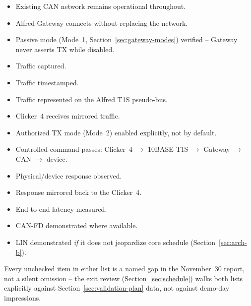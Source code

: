\begin{itemize}[itemsep=0.1em, label={$\square$}]
\item Existing CAN network remains operational throughout.
\item Alfred Gateway connects without replacing the network.
\item Passive mode (Mode~1, Section~\ref{sec:gateway-modes}) verified -- Gateway never asserts TX while disabled.
\item Traffic captured.
\item Traffic timestamped.
\item Traffic represented on the Alfred T1S pseudo-bus.
\item Clicker~4 receives mirrored traffic.
\item Authorized TX mode (Mode~2) enabled explicitly, not by default.
\item Controlled command passes: Clicker~4 $\rightarrow$ 10BASE-T1S $\rightarrow$ Gateway $\rightarrow$ CAN $\rightarrow$ device.
\item Physical/device response observed.
\item Response mirrored back to the Clicker~4.
\item End-to-end latency measured.
\item CAN-FD demonstrated where available.
\item LIN demonstrated \emph{if} it does not jeopardize core schedule (Section~\ref{sec:arch-b}).
\end{itemize}

\begin{decision}[title={How this gate is scored}]
Every unchecked item in either list is a named gap in the November~30 report, not a silent omission -- the exit review (Section~\ref{sec:schedule}) walks both lists explicitly against Section~\ref{sec:validation-plan} data, not against demo-day impressions.
\end{decision}
